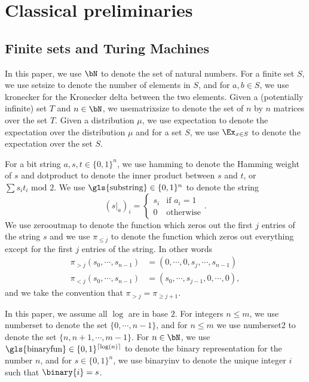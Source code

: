 \section{Classical preliminaries}

\subsection{Finite sets and Turing Machines} \label{sec:preFinitesetTM}
In this paper, we use $\bN$ to denote the set of natural numbers. For a finite set $S$, we use \gls{setsize} to denote the number of elements in $S$, and for $a, b \in S$, we use \gls{kronecker} for the Kronecker delta between the two elements. Given a (potentially infinite) set $T$ and $n \in \bN$, we use\gls{matrixsize} to denote the set of $n$ by $n$ matrices over the set $T$. Given a distribution $\mu$, we use \gls{expectation} to denote the expectation over the distribution $\mu$ and for a set $S$, we use $\Ex_{x \in S}$ to denote the expectation over the set $S$. 

For a bit string $a, s, t \in \{0,1\}^n$, we use \gls{hamming} to denote the Hamming weight of $s$ and \gls{dotproduct} to denote the inner product between $s$ and $t$, or $\sum s_i t_i \text{ mod } 2$. We use $\text{\gls{substring}} \in \{0,1\}^{n}$ to denote the string
\begin{equation*}
 	(s|_a)_i = \begin{cases}
 		s_i &\text{if } a_i =1 \\
 		0 &\text{otherwise}
 	\end{cases}.
\end{equation*}
We use \gls{zerooutmap} to denote the function which zeros out the first $j$ entries of the string $s$ and we use $\pi_{\leq j}$ to denote the function which zeros out everything except for the first $j$ entries of the string. In other words 
\begin{align}
	\pi_{> j}(s_0, \cdots, s_{n-1}) &= (0, \cdots, 0, s_j, \cdots, s_{n-1})  \label{eq:defzeromapstring} \\
	\nonumber \pi_{< j}(s_0, \cdots, s_{n-1}) &= (s_0, \cdots, s_{j-1}, 0, \cdots, 0),
\end{align}
and we take the convention that $\pi_{> j} = \pi_{\geq  j+1}$.

In this paper, we assume all $\log$ are in base $2$. For integers $n \leq m$, we use \gls{numberset} to denote the set $\{0, \cdots, n-1\}$, and for $n \leq m$ we use \gls{numberset2} to denote the set $\{n, n+1, \cdots, m-1\}$. For $n \in \bN$, we use $\text{\gls{binaryfun}} \in \{0,1\}^{\lceil \log(n) \rceil}$ to denote the binary representation for the number $n$, and for $s \in \{0,1\}^n$, we use \gls{binaryinv} to denote the unique integer $i$ such that $\binary{i} = s$.  

